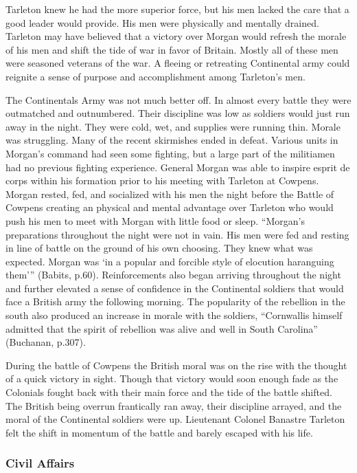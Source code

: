 Tarleton knew he had the more superior force, but his men lacked the care that a
good leader would provide.  His men were physically and mentally drained.
Tarleton may have believed that a victory over Morgan would refresh the morale
of his men and shift the tide of war in favor of Britain.  Mostly all of these
men were seasoned veterans of the war. A fleeing or retreating Continental army
could reignite a sense of purpose and accomplishment among Tarleton’s men.   

The Continentals Army was not much better off.  In almost every battle they were
outmatched and outnumbered. Their discipline was low as soldiers would just run
away in the night. They were cold, wet, and supplies were running thin.  Morale
was struggling.  Many of the recent skirmishes ended in defeat.  Various units
in Morgan’s command had seen some fighting, but a large part of the militiamen
had no previous fighting experience.  General Morgan was able to inspire esprit
de corps within his formation prior to his meeting with Tarleton at Cowpens.
Morgan rested, fed, and socialized with his men the night before the Battle of
Cowpens creating an physical and mental advantage over Tarleton who would push
his men to meet with Morgan with little food or sleep.  “Morgan’s preparations
throughout the night were not in vain.  His men were fed and resting in line of
battle on the ground of his own choosing.  They knew what was expected.  Morgan
was ‘in a popular and forcible style of elocution haranguing them’” (Babits,
p.60).  Reinforcements also began arriving throughout the night and further
elevated a sense of confidence in the Continental soldiers that would face a
British army the following morning.   The popularity of the rebellion in the
south also produced an increase in morale with the soldiers, “Cornwallis himself
admitted that the spirit of rebellion was alive and well in South Carolina”
(Buchanan, p.307). 

During the battle of Cowpens the British moral was on the rise with the thought
of a quick victory in sight. Though that victory would soon enough fade as the
Colonials fought back with their main force and the tide of the battle shifted.
The British being overrun frantically ran away, their discipline arrayed, and
the moral of the Continental soldiers were up. Lieutenant Colonel Banastre
Tarleton felt the shift in momentum of the battle and barely escaped with his
life. 

\subsubsection{Civil Affairs}

